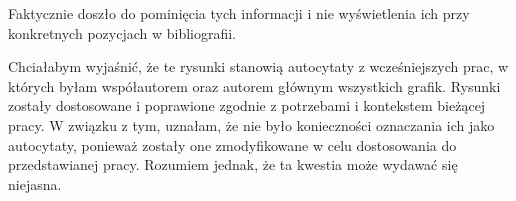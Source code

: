 \begin{frame}[t]
    \begin{block}{\tb}
    \end{block}

Faktycznie doszło do pominięcia tych informacji i nie wyświetlenia ich przy konkretnych pozycjach w bibliografii.

    \begin{block}{\tb}
    \end{block}


    Chciałabym wyjaśnić, że te rysunki stanowią autocytaty z wcześniejszych prac, w których byłam współautorem oraz autorem głównym wszystkich grafik. Rysunki zostały dostosowane i poprawione zgodnie z potrzebami i kontekstem bieżącej pracy. W związku z tym, uznałam, że nie było konieczności oznaczania ich jako autocytaty, ponieważ zostały one zmodyfikowane w celu dostosowania do przedstawianej pracy. Rozumiem jednak, że ta kwestia może wydawać się niejasna.


\end{frame}

